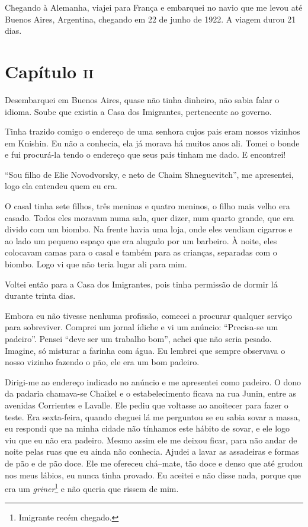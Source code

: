 Chegando à Alemanha, viajei para França e embarquei no navio que me
levou até Buenos Aires, Argentina, chegando em 22 de junho de 1922. A
viagem durou 21 dias.

\chapter{Capítulo \textsc{ii}}

Desembarquei em Buenos Aires, quase não tinha dinheiro, não sabia falar
o idioma. Soube que existia a Casa dos Imigrantes, pertencente ao
governo.

Tinha trazido comigo o endereço de uma senhora cujos pais eram nossos
vizinhos em Knishin. Eu não a conhecia, ela já morava há muitos anos
ali. Tomei o bonde e fui procurá-la tendo o endereço que seus pais
tinham me dado. E encontrei!

``Sou filho de Elie Novodvorsky, e neto de Chaim Shneguevitch'', me
apresentei, logo ela entendeu quem eu era.

O casal tinha sete filhos, três meninas e quatro meninos, o filho mais
velho era casado. Todos eles moravam numa sala, quer dizer, num quarto
grande, que era divido com um biombo. Na frente havia uma loja, onde
eles vendiam cigarros e ao lado um pequeno espaço que era alugado por um
barbeiro. À noite, eles colocavam camas para o casal e também para as
crianças, separadas com o biombo. Logo vi que não teria lugar ali para
mim.

Voltei então para a Casa dos Imigrantes, pois tinha permissão de dormir
lá durante trinta dias.

Embora eu não tivesse nenhuma profissão, comecei a procurar qualquer
serviço para sobreviver. Comprei um jornal ídiche e vi um anúncio:
``Precisa-se um padeiro''. Pensei ``deve ser um trabalho bom'', achei
que não seria pesado. Imagine, só misturar a farinha com água. Eu
lembrei que sempre observava o nosso vizinho fazendo o pão, ele era um
bom padeiro.

Dirigi-me ao endereço indicado no anúncio e me apresentei como padeiro.
O dono da padaria chamava-se Chaikel e o estabelecimento ficava na rua
Junin, entre as avenidas Corrientes e Lavalle. Ele pediu que voltasse ao
anoitecer para fazer o teste. Era sexta-feira, quando cheguei lá me
perguntou se eu sabia sovar a massa, eu respondi que na minha cidade não
tínhamos este hábito de sovar, e ele logo viu que eu não era padeiro.
Mesmo assim ele me deixou ficar, para não andar de noite pelas ruas que
eu ainda não conhecia. Ajudei a lavar as assadeiras e formas de pão e de
pão doce. Ele me ofereceu chá--mate, tão doce e denso que até grudou nos
meus lábios, eu nunca tinha provado. Eu aceitei e não disse nada, porque
que era um \textit{griner}\footnote{Imigrante recém chegado.} e não queria
que rissem de mim.

